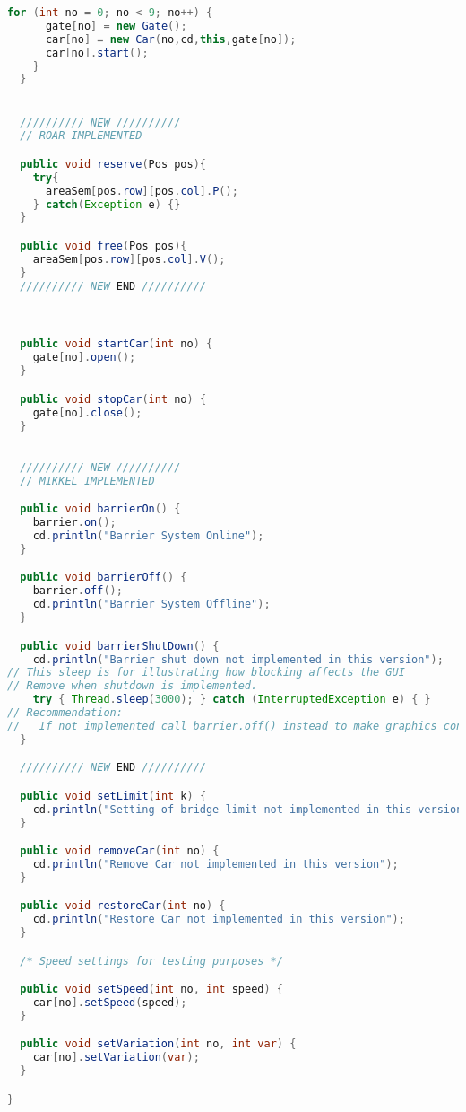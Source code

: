 \begin{lstlisting}[language=java]
    for (int no = 0; no < 9; no++) {
      gate[no] = new Gate();
      car[no] = new Car(no,cd,this,gate[no]);
      car[no].start();
    } 
  }


  ////////// NEW //////////
  // ROAR IMPLEMENTED

  public void reserve(Pos pos){
    try{
      areaSem[pos.row][pos.col].P();
    } catch(Exception e) {}
  }

  public void free(Pos pos){
    areaSem[pos.row][pos.col].V();
  }
  ////////// NEW END //////////



  public void startCar(int no) {
    gate[no].open();
  }

  public void stopCar(int no) {
    gate[no].close();
  }

  
  ////////// NEW //////////
  // MIKKEL IMPLEMENTED

  public void barrierOn() {
    barrier.on();
    cd.println("Barrier System Online");
  }

  public void barrierOff() { 
    barrier.off();
    cd.println("Barrier System Offline");
  }

  public void barrierShutDown() { 
    cd.println("Barrier shut down not implemented in this version");
// This sleep is for illustrating how blocking affects the GUI
// Remove when shutdown is implemented.
    try { Thread.sleep(3000); } catch (InterruptedException e) { }
// Recommendation: 
//   If not implemented call barrier.off() instead to make graphics consistent
  }

  ////////// NEW END //////////

  public void setLimit(int k) { 
    cd.println("Setting of bridge limit not implemented in this version");
  }

  public void removeCar(int no) { 
    cd.println("Remove Car not implemented in this version");
  }

  public void restoreCar(int no) { 
    cd.println("Restore Car not implemented in this version");
  }

  /* Speed settings for testing purposes */

  public void setSpeed(int no, int speed) { 
    car[no].setSpeed(speed);
  }

  public void setVariation(int no, int var) { 
    car[no].setVariation(var);
  }

}







\end{lstlisting}
